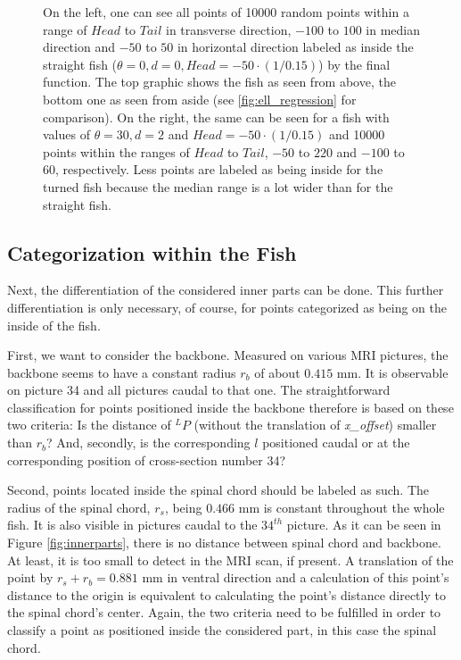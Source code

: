 \begin{figure}[ht]
\begin{subfigure}[b]{0.5\linewidth}
  \end{subfigure} 
  \caption{On the left, one can see all points of 10000 random points within a range of $Head$ to $Tail$ in transverse direction, $-100$ to $100$ in median direction and $-50$ to $50$ in horizontal direction labeled as inside the straight fish ($\theta = 0, d = 0, Head = -50 \cdot (1/0.15)$) by the final function. The top graphic shows the fish as seen from above, the bottom one as seen from aside (see \ref{fig:ell_regression} for comparison). On the right, the same can be seen for a fish with values of $\theta = 30, d = 2$ and $Head = -50 \cdot (1/0.15)$ and 10000 points within the ranges of $Head$ to $Tail$, $-50$ to $220$ and $-100$ to $60$, respectively. Less points are labeled as being inside for the turned fish because the median range is a lot wider than for the straight fish.}
  \label{fig:final_fish}
\end{figure}

\subsection{Categorization within the Fish}
    \label{innerparts}
    
Next, the differentiation of the considered inner parts can be done. This further differentiation is only necessary, of course, for points categorized as being on the inside of the fish. 

First, we want to consider the backbone. Measured on various MRI pictures, the backbone seems to have a constant radius $r_b$ of about $0.415$ mm. It is observable on picture 34 and all pictures caudal to that one. The straightforward classification for points positioned inside the backbone therefore is based on these two criteria: Is the distance of ${}^LP$ (without the translation of \textit{x\_offset}) smaller than $r_b$? And, secondly, is the corresponding $l$ positioned caudal or at the corresponding position of cross-section number 34? 

Second, points located inside the spinal chord should be labeled as such. The radius of the spinal chord, $r_s$, being $0.466$ mm is constant throughout the whole fish. It is also visible in pictures caudal to the $34^{th}$ picture. As it can be seen in Figure \ref{fig:innerparts}, there is no distance between spinal chord and backbone. At least, it is too small to detect in the MRI scan, if present. A translation of the point by $r_s+r_b = 0.881$ mm in ventral direction and a calculation of this point's distance to the origin is equivalent to calculating the point's distance directly to the spinal chord's center. Again, the two criteria need to be fulfilled in order to classify a point as positioned inside the considered part, in this case the spinal chord. 

